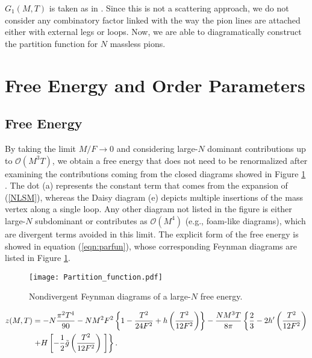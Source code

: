 \documentclass{PoS}
\begin{document}
\noindent $G_{1}(M,T)$ is taken as in \cite{Gerber:1988tt}. Since this is not a scattering approach, we do not consider any combinatory factor linked with the way the pion lines are attached either with external legs or loops. Now, we are able to diagramatically construct the partition function for $N$ massless pions.


\section{Free Energy and Order Parameters}

\subsection{Free Energy}

By taking the limit $M/F\rightarrow 0$ and considering large-$N$ dominant contributions up to $\mathcal{O}(M^{3}T)$, we obtain a free energy that does not need to be renormalized after examining the contributions coming from the closed diagrams showed in Figure \ref{fig:partfun} \cite{Cortes:2016ecy}. The dot (a) represents the constant term that comes from the expansion of (\ref{NLSM}), whereas the Daisy diagram (e) depicts multiple insertions of the mass vertex along a single loop. Any other diagram not listed in the figure is either large-$N$ subdominant or contributes as $\mathcal{O}(M^{4})$ (e.g., foam-like diagrams), which are divergent terms avoided in this limit. The explicit form of the free energy is showed in equation (\ref{eqn:parfun}), whose corresponding Feynman diagrams are listed in Figure \ref{fig:partfun}.

\begin{figure}
\centering
\texttt{[image: Partition\_function.pdf]}
\caption{Nondivergent Feynman diagrams of a large-$N$ free energy.}
\label{fig:partfun}
\end{figure}

\vspace{-0.5cm}

\begin{align}
 z(M,T)&=-N\frac{\pi^{2}T^{4}}{90} -NM^2F^2\left\{ 1-\frac{T^{2}}{24F^{2}}+h\left(\frac{T^2}{12F^2}\right)\right\} -\frac{NM^3T}{8\pi}\left\{\frac{2}{3}-2h'\left(\frac{T^{2}}{12F^{2}}\right)\right. \notag \\
&\left. +H\left[-\frac{1}{2} \tilde g\left(\frac{T^2}{12F^2}\right)\ \right]\right\}. \label{eqn:parfun}\end{align}
\end{document}

